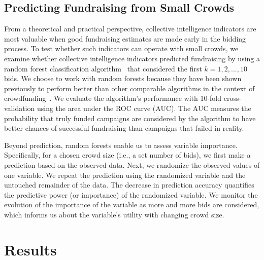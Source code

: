 \documentclass[sigconf]{acmart}
\begin{document}
\subsection{Predicting Fundraising from Small Crowds}
From a theoretical and practical perspective, collective intelligence indicators are most valuable when good fundraising estimates are made early in the bidding process. To test whether such indicators can operate with small crowds, we examine whether collective intelligence indicators predicted fundraising by using a random forest classification algorithm~\cite{Breiman2001} that considered the first $k={1,2,...,10}$ bids. We choose to work with random forests because they have been shown previously to perform better than other comparable algorithms in the context of crowdfunding~\cite{Greenberg2013}. We evaluate the algorithm's performance with 10-fold cross-validation using the area under the ROC curve (AUC). The AUC measures the probability that truly funded campaigns are considered by the algorithm to have better chances of successful fundraising than campaigns that failed in reality. 

Beyond prediction, random forests enable us to assess variable importance. Specifically, for a chosen crowd size (i.e., a set number of bids), we first make a prediction based on the observed data. Next, we randomize the observed values of one variable. We repeat the prediction using the randomized variable and the untouched remainder of the data. The decrease in prediction accuracy quantifies the predictive power (or importance) of the randomized variable. We monitor the evolution of the importance of the variable as more and more bids are considered, which informs us about the variable's utility with changing crowd size. 

\section{Results}
\end{document}
